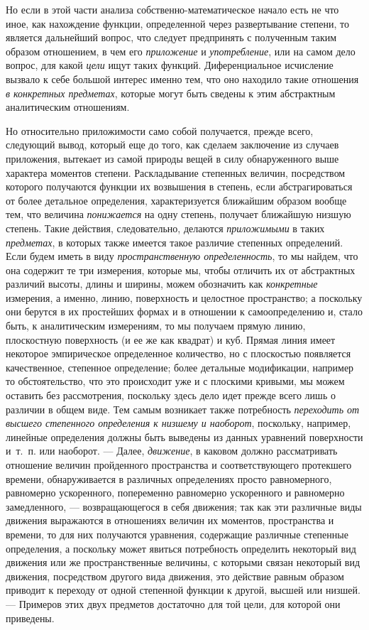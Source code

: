 {Но если в этой части анализа собственно-математическое начало есть не что
иное, как нахождение функции, определенной через развертывание степени, то
является дальнейший вопрос, что следует предпринять с полученным таким
образом отношением, в чем его {\em приложение} и
{\em употребление}, или на самом дело вопрос, для какой
{\em цели} ищут таких функций. Диференциальное
исчисление вызвало к себе большой интерес именно тем, что оно находило
такие отношения {\em в конкретных предметах}, которые
могут быть сведены к этим абстрактным аналитическим отношениям.

Но относительно приложимости само собой получается, прежде всего, следующий
вывод, который еще до того, как сделаем заключение из случаев приложения,
вытекает из самой природы вещей в силу обнаруженного выше характера
моментов степени. Раскладывание степенных величин, посредством которого
получаются функции их возвышения в степень, если абстрагироваться от более
детальное определения, характеризуется ближайшим образом вообще тем, что
величина {\em понижается} на одну степень, получает
ближайшую низшую степень. Такие действия, следовательно, делаются
{\em приложимыми} в таких
{\em предметах}, в которых также имеется такое различие
степенных определений. Если будем иметь в виду
{\em пространственную определенность}, то мы найдем,
что она содержит те три измерения, которые мы, чтобы отличить их от
абстрактных различий высоты, длины и ширины, можем обозначить как
{\em конкретные} измерения, а именно, линию,
поверхность и целостное пространство; а поскольку они берутся в их
простейших формах и в отношении к самоопределению и, стало быть, к
аналитическим измерениям, то мы получаем прямую линию, плоскостную
поверхность (и ее же как квадрат) и куб. Прямая линия имеет некоторое
эмпирическое определенное количество, но с плоскостью появляется
качественное, степенное определение; более детальные модификации, например
то обстоятельство, что это происходит уже и с плоскими кривыми, мы можем
оставить без рассмотрения, поскольку здесь дело идет прежде всего лишь о
различии в общем виде. Тем самым возникает также потребность
{\em переходить от высшего степенного определения к
низшему и наоборот}, поскольку, например, линейные определения должны быть
выведены из данных уравнений поверхности и~т.~п. или наоборот. — Далее,
{\em движение}, в каковом должно рассматривать
отношение величин пройденного пространства и соответствующего протекшего
времени, обнаруживается в различных определениях просто равномерного,
равномерно ускоренного, попеременно равномерно ускоренного и равномерно
замедленного, — возвращающегося в себя движения; так как эти различные виды
движения выражаются в отношениях величин их моментов, пространства и
времени, то для них получаются уравнения, содержащие различные степенные
определения, а поскольку может явиться потребность определить некоторый вид
движения или же пространственные величины, с которыми связан некоторый вид
движения, посредством другого вида движения, это действие равным образом
приводит к переходу от одной степенной функции к другой, высшей или низшей.
— Примеров этих двух предметов достаточно для той цели, для которой они
приведены.

}
